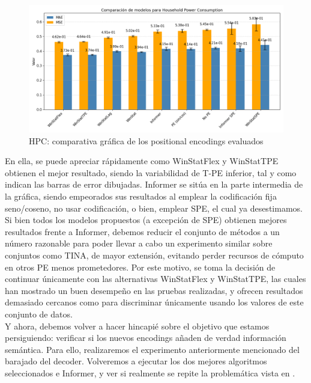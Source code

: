 \begin{figure}[!ht]
	\centering
	\includegraphics[scale=0.475]{img/hpcgraph}
	\caption{HPC: comparativa gráfica de los positional encodings evaluados}
	\label{hpcgraph}
\end{figure}

En ella, se puede apreciar rápidamente como WinStatFlex y WinStatTPE obtienen el mejor resultado, siendo la variabilidad de T-PE inferior, tal y como indican las barras de error dibujadas.  Informer se sitúa en la parte intermedia de la gráfica, siendo empeorados sus resultados al emplear la codificación fija seno/coseno, no usar codificación, o bien, emplear SPE, el cual ya desestimamos.\\

Si bien todos los modelos propuestos (a excepción de SPE) obtienen mejores resultados frente a Informer, debemos reducir el conjunto de métodos a un número razonable para poder llevar a cabo un experimento similar sobre conjuntos como TINA, de mayor extensión, evitando perder recursos de cómputo en otros PE menos prometedores. Por este motivo, se toma la decisión de continuar únicamente con las alternativas WinStatFlex y WinStatTPE, las cuales han mostrado un buen desempeño en las pruebas realizadas, y ofrecen resultados demasiado cercanos como para discriminar únicamente usando los valores de este conjunto de datos.\\

Y ahora, debemos volver a hacer hincapié sobre el objetivo que estamos persiguiendo: verificar si los nuevos encodings añaden de verdad información semántica. Para ello, realizaremos el experimento anteriormente mencionado del barajado del decoder. Volveremos a ejecutar los dos mejores algoritmos seleccionados e Informer, y ver si realmente se repite la problemática vista en \cite{zeng2022transformerseffectivetimeseries}.\\

